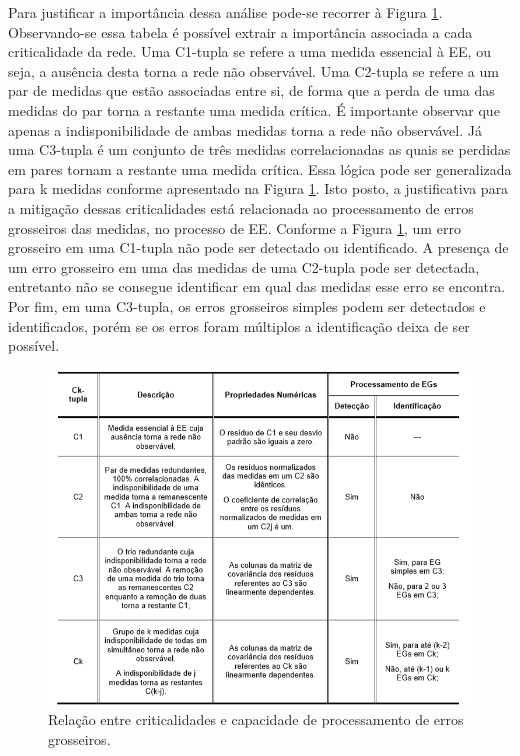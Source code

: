 \documentclass[12pt]{article}
\begin{document}
Para justificar a importância dessa análise pode-se recorrer à Figura \ref{fig1}. Observando-se essa tabela é possível extrair a importância associada a cada criticalidade da rede. Uma C1-tupla se refere a uma medida essencial à EE, ou seja, a ausência desta torna a rede não observável. Uma C2-tupla se refere a um par de medidas que estão associadas entre si, de forma que a perda de uma das medidas do par torna a restante uma medida crítica. É importante observar que apenas a indisponibilidade de ambas medidas torna a rede não observável. Já uma C3-tupla é um conjunto de três medidas correlacionadas as quais se perdidas em pares tornam a restante uma medida crítica. Essa lógica pode ser generalizada para k medidas conforme apresentado na Figura \ref{fig1}. Isto posto, a justificativa para a mitigação dessas criticalidades está relacionada ao processamento de erros grosseiros das medidas, no processo de EE. Conforme a Figura \ref{fig1}, um erro grosseiro em uma C1-tupla não pode ser detectado ou identificado. A presença de um erro grosseiro em uma das medidas de uma C2-tupla pode ser detectada, entretanto não se consegue identificar em qual das medidas esse erro se encontra. Por fim, em uma C3-tupla, os erros grosseiros simples podem ser detectados e identificados, porém se os erros foram múltiplos a identificação deixa de ser possível.

\begin{figure}[H]
	\centering 
	\includegraphics[scale=0.9]{figuras/Criticalidades-med.jpg}
	\caption{Relação entre criticalidades e capacidade de processamento de erros grosseiros.\cite{AbelTese16}}
	\label{fig1} %
\end{figure}
\end{document}
